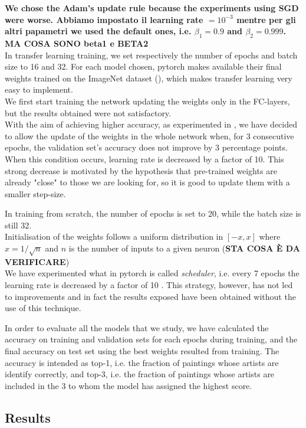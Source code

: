 \documentclass{article}
\begin{document}
\textbf{We chose the Adam's update rule because the experiments using SGD were worse. \textbf{Abbiamo impostato il }learning rate $= 10^{-3}$ mentre per gli altri papametri we used the default ones, i.e. $\beta_{1}  = 0.9$ and $\beta_{2} = 0.999$.  \textbf{MA COSA SONO beta1 e BETA2}}\\

In transfer learning training, we set respectively the number of epochs and batch size to 16 and 32.  For each model chosen, pytorch makes available their final weights  trained on the ImageNet dataset (\cite{imagenet}), which makes transfer learning very easy to implement.\\
We first start training the network updating the weights only in the FC-layers, but the results obtained were not satisfactory.\\
With the aim of achieving higher accuracy, as experimented in \cite{ArtistIdCNN406}, we have decided to allow the update of the weights in the whole network when, for 3 consecutive epochs, the validation set's accuracy does not improve by 3 percentage points. When this condition occurs, learning rate is decreased by a factor of 10. This strong decrease is motivated by the hypothesis  that pre-trained weights are already "close" to those we are looking for, so it is good to update them with a smaller step-size.

In training from scratch, the number of epochs is set to 20, while the batch size is still 32.\\ 
Initialisation of the weights follows a uniform distribution in $[-x, x]$ where $x=1/\sqrt n$ and $n$ is the number of inputs to a given neuron (\textbf{STA COSA È DA VERIFICARE})\\
We have experimented what in pytorch is called \textit{scheduler}, i.e. every 7 epochs the learning rate is decreased by a factor of 10 . This strategy, however, has not led to improvements and in fact the results exposed have been obtained without the use of this technique.

In order to evaluate all the models that we study, we have calculated the accuracy on training and validation sets for each epochs during training, and the final accuracy on test set using the best weights resulted from training. The accuracy is intended as top-1, i.e.  the fraction of paintings whose artists are identify correctly, and top-3, i.e. the fraction of paintings whose artists are included in the 3 to whom the model has assigned the highest score.

\subsection{Results}\label{results}
\end{document}
